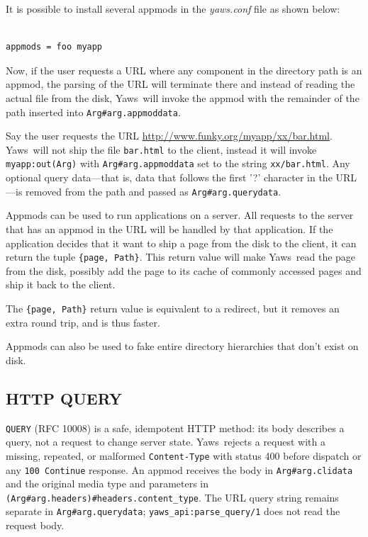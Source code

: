 \documentclass[11pt,oneside,english]{book}
\newcommand{\Yaws}            %
        {{\sc Yaws}}
\begin{document}
It is possible to install several appmods in the \textit{yaws.conf}
file as shown below:

\begin{verbatim}

appmods = foo myapp

\end{verbatim}

Now, if the user requests a URL where any component in the
directory path is an appmod, the parsing of the URL will terminate
there and instead of reading the actual file from the disk, \Yaws\  will
invoke the appmod with the remainder of the path inserted into
\verb+Arg#arg.appmoddata+.

Say the user requests the URL
\url{http://www.funky.org/myapp/xx/bar.html}.  \Yaws\ will not ship
the file \verb+bar.html+ to the client, instead it will invoke
\verb+myapp:out(Arg)+ with \verb+Arg#arg.appmoddata+ set to the string
\verb+xx/bar.html+. Any optional query data---that is, data that
follows the first '?' character in the URL---is removed from the path
and passed as \verb+Arg#arg.querydata+.

Appmods can be used to run applications on a server. All requests
to the server that has an appmod in the URL will be handled by that
application. If the application decides that it want to
ship a page from the disk to the client, it can return the
tuple \verb+{page, Path}+. This return value will make \Yaws\  read
the page from the disk, possibly add the page to its cache of
commonly accessed pages and ship it back to the client.

The \verb+{page, Path}+ return value is equivalent to a
redirect, but it removes an extra round trip, and is thus faster.

Appmods can also be used to fake entire directory hierarchies
that don't exist on disk.

\subsection{HTTP QUERY}

\verb+QUERY+ (RFC 10008) is a safe, idempotent HTTP method: its body
describes a query, not a request to change server state. \Yaws\ rejects
a request with a missing, repeated, or malformed \verb+Content-Type+
with status 400 before dispatch or any \verb+100 Continue+ response.
An appmod receives the body in \verb+Arg#arg.clidata+ and the original
media type and parameters in \verb+(Arg#arg.headers)#headers.content_type+.
The URL query string remains separate in \verb+Arg#arg.querydata+;
\verb+yaws_api:parse_query/1+ does not read the request body.
\end{document}

